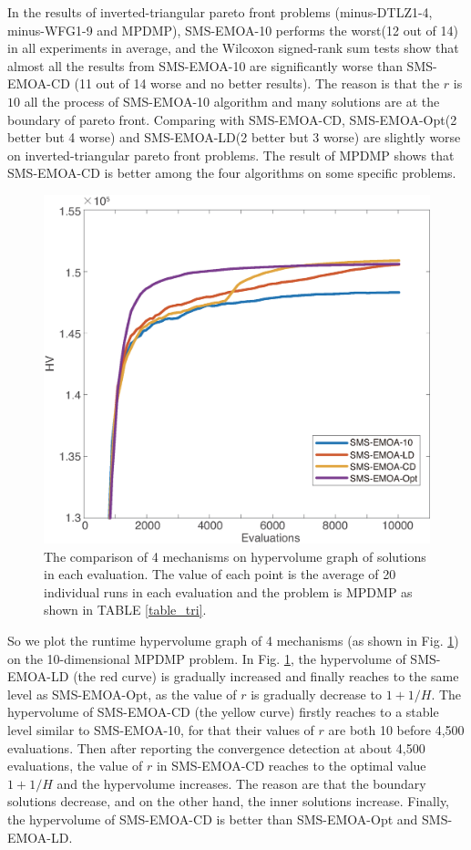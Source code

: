 \documentclass[conference]{IEEEtran}
\begin{document}
In the results of inverted-triangular pareto front problems (minus-DTLZ1-4, minus-WFG1-9 and MPDMP), 
SMS-EMOA-10 performs the worst(12 out of 14) in all experiments in average, 
and the Wilcoxon signed-rank sum tests show that almost all the results from SMS-EMOA-10 are significantly worse than SMS-EMOA-CD
(11 out of 14 worse and no better results). 
The reason is that the $r$ is $10$ all the process of SMS-EMOA-10 algorithm and many solutions are at the boundary of pareto front.
Comparing with SMS-EMOA-CD, SMS-EMOA-Opt(2 better but 4 worse) and SMS-EMOA-LD(2 better but 3 worse) are slightly worse 
on inverted-triangular pareto front problems. 
The result of MPDMP shows that SMS-EMOA-CD is better among the four algorithms on some specific problems. 

\begin{figure}[!t]
  \centering
    \includegraphics[width=\columnwidth]{SMSEMOA_MPDMP_hv}
  \caption{The comparison of 4 mechanisms on hypervolume graph of solutions in each evaluation. 
  The value of each point is the average of 20 individual runs in each evaluation
  and the problem is MPDMP as shown in TABLE \ref{table_tri}. 
  }
  \label{crdmp}
\end{figure}
So we plot the runtime hypervolume graph of 4 mechanisms (as shown in Fig. \ref{crdmp}) on the 10-dimensional MPDMP problem. 
In Fig. \ref{crdmp}, the hypervolume of SMS-EMOA-LD (the red curve) is gradually increased 
and finally reaches to the same level as SMS-EMOA-Opt, as the value of $r$ is gradually decrease to $1+1/H$.
The hypervolume of SMS-EMOA-CD (the yellow curve) firstly reaches to a stable level similar to SMS-EMOA-10, 
for that their values of $r$ are both 10 before 4,500 evaluations. 
Then after reporting the convergence detection at about 4,500 evaluations, 
the value of $r$ in SMS-EMOA-CD reaches to the optimal value $1+1/H$ 
and the hypervolume increases. 
The reason are that the boundary solutions decrease, and on the other hand, the inner solutions increase. 
Finally, the hypervolume of SMS-EMOA-CD is better than SMS-EMOA-Opt and SMS-EMOA-LD. 
\end{document}
